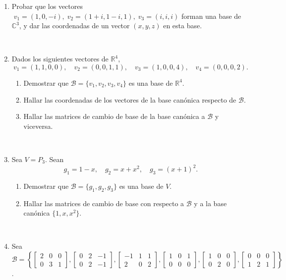 \documentclass[12pt]{amsart}
\begin{document}
\begin{enumerate}

	
	\item
Probar que los vectores $\;v_1=(1,0,-i),\;
v_2=(1+i,1-i,1),\;v_3=(i,i,i)$ forman una base de $\mathbb{C}^3$,
y dar las coordenadas de un vector $(x,y,z)$ en esta base.

\

\item Dados los siguientes vectores de $\mathbb{R}^4$,
$$
v_1=(1,1,0,0), \quad v_2=(0,0,1,1), \quad v_3=(1,0,0,4),
\quad v_4=(0,0,0,2).
$$
\begin{enumerate}
	\item Demostrar que
	$\mathcal{B}=\{v_1,v_2,v_3,v_4\}$ es una base de
	$\mathbb{R}^{4}$.
	\item Hallar las coordenadas de los vectores de la
	base can\'onica respecto de $\mathcal{B}$.
	\item Hallar las matrices de cambio de base de la base can\'onica
	a $\mathcal{B}$ y viceversa.
\end{enumerate}

\

\item  Sea $V=P_3$.
Sean
$$ g_1=1-x,\quad g_2=x+x^2, \quad g_3=(x+1)^2.$$
\begin{enumerate}
	\item Demostrar que $\mathcal{B}=\{g_1,g_2,g_3\}$ es una base de $V$.
	\item Hallar las matrices de cambio de base con respecto a $\mathcal{B}$
	y a la base can{\'o}nica $\{1,x,x^2\}$.
\end{enumerate}

\

\item Sea $\mathcal{B}=
\left\{
\begin{bmatrix}
2 & 0& 0 \\
0 & 3& 1
\end{bmatrix},
\begin{bmatrix}
0& 2& -1\\
0& 2&-1
\end{bmatrix},
\begin{bmatrix}
-1 &1&1 \\
2 & 0 &2
\end{bmatrix},
\begin{bmatrix}
1 &0 &1\\
0 &0 &0
\end{bmatrix},
\begin{bmatrix}
1& 0& 0\\
0 &2 &0
\end{bmatrix},
\begin{bmatrix}
0 &0 & 0\\
1 & 2&1
\end{bmatrix}
\right\}$.



\end{enumerate}
\end{document}
